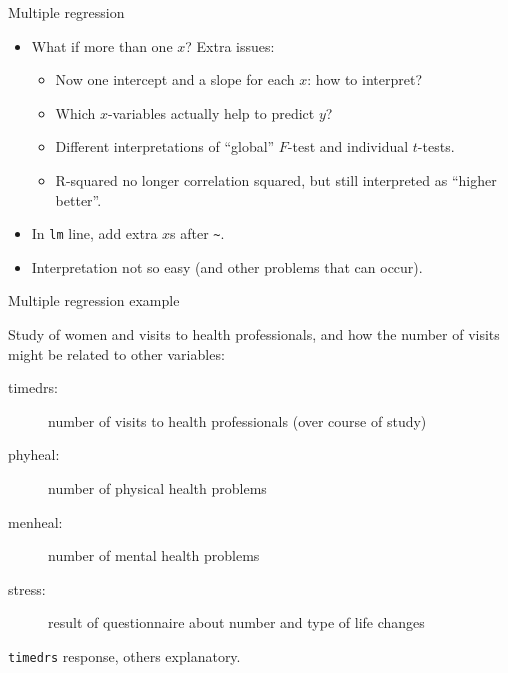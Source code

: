 
\begin{frame}[fragile]{Multiple regression}

  \begin{itemize}
  \item What if more than one $x$? Extra issues: %
    \begin{itemize}
    \item Now one intercept and a slope for each $x$: how to interpret?
    \item Which $x$-variables actually help to predict $y$?

    \item Different interpretations of ``global'' $F$-test and individual $t$-tests.
    \item R-squared no longer correlation squared, but still
      interpreted as ``higher better''.
    \end{itemize}
  \item In \verb-lm- line, add extra $x$s after \verb-~-.
  \item Interpretation not so easy (and other problems that can occur).
  \end{itemize}

\end{frame}

\begin{frame}[fragile]{Multiple regression example}

Study of women and visits to health professionals, and how the number of visits might be related to other variables:

\begin{description}
\item[timedrs:] number of visits to health professionals (over course of study)
\item[phyheal:] number of physical health problems
\item[menheal:] number of mental health problems
\item[stress:] result of questionnaire about number and type of life changes
\end{description}

\verb-timedrs- response, others explanatory.

\end{frame}

